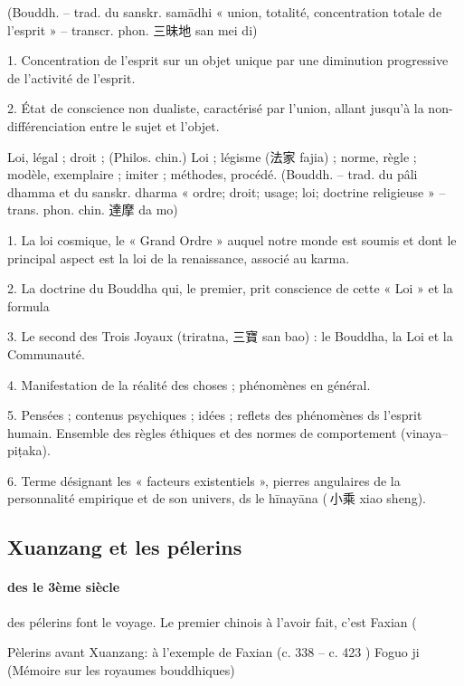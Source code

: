 \begin{Def}[ ding 定]
    (Bouddh. – trad. du sanskr. samādhi « union, totalité, concentration totale de l’esprit » – transcr. phon. 三昧地 san mei di) 
    
    1. Concentration de l’esprit sur un objet unique par une diminution progressive de l’activité de l’esprit. 
    
    2.  État de conscience non dualiste, caractérisé par l’union, allant jusqu’à la non-différenciation entre le sujet et l’objet. 
\end{Def}
\begin{Def}[fa 法]
    Loi, légal ; droit ; (Philos. chin.) Loi ; légisme (法家 fajia) ; norme, règle ; modèle, exemplaire ; imiter ; méthodes, procédé. (Bouddh. – trad. du pâli dhamma et du sanskr. dharma « ordre; droit; usage; loi; doctrine religieuse » – trans. phon. chin. 達摩 da mo) 
    
    1. La loi cosmique, le « Grand Ordre » auquel notre monde est soumis et dont le principal aspect est la loi de la renaissance, associé au karma. 
    
    2. La doctrine du Bouddha qui, le premier, prit conscience de cette « Loi » et la formula 
    
    3. Le second des Trois Joyaux (triratna, 三寶 san bao) : le Bouddha, la Loi et la Communauté. 
    
    4. Manifestation de la réalité des choses ; phénomènes en général. 
    
    5. Pensées ; contenus psychiques ; idées ; reflets des phénomènes ds l’esprit humain. Ensemble des règles éthiques et des normes de comportement (vinaya–piṭaka).  
    
    6. Terme désignant les « facteurs existentiels », pierres angulaires de la personnalité empirique et de son univers, ds le hīnayāna ( 小乘 xiao sheng).
\end{Def}

\subsection{Xuanzang et les pélerins}

\paragraph{des le 3ème siècle} des pélerins font le voyage. Le premier chinois à l'avoir fait, c'est Faxian (


Pèlerins avant Xuanzang: à l’exemple de Faxian    (c. 338 -- c. 423 )	Foguo ji (Mémoire sur les royaumes bouddhiques)

